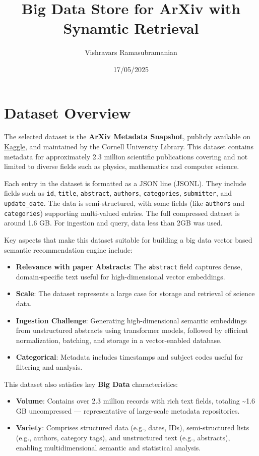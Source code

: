 \documentclass[11pt]{article}
\author{Vishravars Ramasubramanian}
\date{17/05/2025}
\title{Big Data Store for ArXiv with Synamtic Retrieval}
\begin{document}
\maketitle
\section*{Dataset Overview}
\label{sec:org9204ea6}
The selected dataset is the \textbf{ArXiv Metadata Snapshot}, publicly available on \href{https://www.kaggle.com/datasets/Cornell-University/arxiv/data}{Kaggle}, and maintained by the Cornell University Library. This dataset contains metadata for approximately 2.3 million scientific publications covering and not limited to diverse fields such as physics, mathematics and computer science.

Each entry in the dataset is formatted as a JSON line (JSONL). They include fields such as \texttt{id}, \texttt{title}, \texttt{abstract}, \texttt{authors}, \texttt{categories}, \texttt{submitter}, and \texttt{update\_date}. The data is semi-structured, with some fields (like \texttt{authors} and \texttt{categories}) supporting multi-valued entries. The full compressed dataset is around 1.6 GB. For ingestion and query, data less than 2GB was used.

Key aspects that make this dataset suitable for building a big data vector based semantic recommendation engine include:

\begin{itemize}
\item \textbf{Relevance with paper Abstracts}: The \texttt{abstract} field captures dense, domain-specific text useful for high-dimensional vector embeddings.
\item \textbf{Scale}: The dataset represents a large case for storage and retrieval of science data.
\item \textbf{Ingestion Challenge}: Generating high-dimensional semantic embeddings from unstructured abstracts using transformer models, followed by efficient normalization, batching, and storage in a vector-enabled database.
\item \textbf{Categorical}: Metadata includes timestamps and subject codes useful for filtering and analysis.
\end{itemize}

This dataset also satisfies key \textbf{Big Data} characteristics:
\begin{itemize}
\item \textbf{Volume}: Contains over 2.3 million records with rich text fields, totaling \textasciitilde{}1.6 GB uncompressed — representative of large-scale metadata repositories.
\item \textbf{Variety}: Comprises structured data (e.g., dates, IDs), semi-structured lists (e.g., authors, category tags), and unstructured text (e.g., abstracts), enabling multidimensional semantic and statistical analysis.
\end{itemize}
\end{document}
